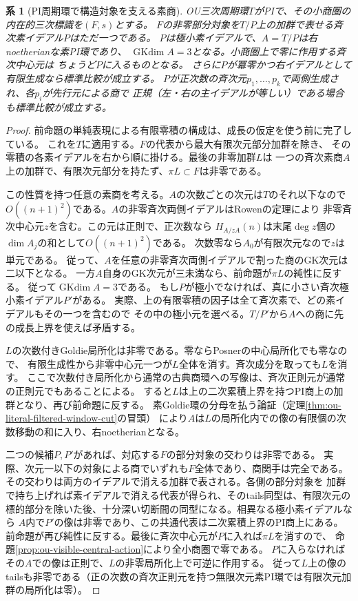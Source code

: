 \documentclass[11pt,a4paper]{ltjsarticle}
\newtheorem{corollary}[theorem]{系}
\theoremstyle{definition}
\begin{document}
\begin{corollary}[PI周期環で構造対象を支える素商]
\label{cor:ou-pi-realized-component}
OU三次周期環$T$がPIで、その小商圏の内在的三次標識を$(F,s)$とする。
$F$の非零部分対象を$T/P$上の加群で表せる斉次素イデアル$P$はただ一つである。
$P$は極小素イデアルで、$A=T/P$は右noetherianな素PI環であり、
$\operatorname{GKdim}A=3$となる。小商圏上で零に作用する斉次中心元は
ちょうど$P$に入るものとなる。
さらに$P$が冪零かつ右イデアルとして有限生成なら標準比較が成立する。
$P$が正次数の斉次元$p_1,\dots,p_k$で両側生成され、各$p_i$が先行元による商で
正規（左・右の主イデアルが等しい）である場合も標準比較が成立する。
\end{corollary}
\begin{proof}
前命題の単純表現による有限零積の構成は、成長の仮定を使う前に完了している。
これを$T$に適用する。$F$の代表から最大有限次元部分加群を除き、
その零積の各素イデアルを右から順に掛ける。最後の非零加群$L$は
一つの斉次素商$A$上の加群で、有限次元部分を持たず、$\pi L\subset F$は非零である。

この性質を持つ任意の素商を考える。$A$の次数ごとの次元は$T$のそれ以下なので
$O((n+1)^2)$である。$A$の非零斉次両側イデアルはRowenの定理により
非零斉次中心元$z$を含む。この元は正則で、正次数なら
$H_{A/zA}(n)$は末尾$\deg z$個の$\dim A_j$の和として$O((n+1)^2)$である。
次数零なら$A_0$が有限次元なので$z$は単元である。
従って、$A$を任意の非零斉次両側イデアルで割った商のGK次元は二以下となる。
一方$A$自身のGK次元が三未満なら、前命題が$\pi L$の純性に反する。
従って$\operatorname{GKdim}A=3$である。
もし$P$が極小でなければ、真に小さい斉次極小素イデアル$P'$がある。
実際、上の有限零積の因子は全て斉次素で、どの素イデアルもその一つを含むので
その中の極小元を選べる。$T/P'$から$A$への商に先の成長上界を使えば矛盾する。

$L$の次数付きGoldie局所化は非零である。零ならPosnerの中心局所化でも零なので、
有限生成性から非零中心元一つが$L$全体を消す。斉次成分を取っても$L$を消す。
ここで次数付き局所化から通常の古典商環への写像は、斉次正則元が通常の正則元でもあることによる。
すると$L$は上の二次累積上界を持つPI商上の加群となり、再び前命題に反する。
素Goldie環の分母を払う論証（定理\ref{thm:ou-literal-filtered-window-cut}の冒頭）
により$A$は$L$の局所化内での像の有限個の次数移動の和に入り、右noetherianとなる。

二つの候補$P,P'$があれば、対応する$F$の部分対象の交わりは非零である。
実際、次元一以下の対象による商でいずれも$F$全体であり、商関手は完全である。
その交わりは両方のイデアルで消える加群で表される。各側の部分対象を
加群で持ち上げれば素イデアルで消える代表が得られ、そのtails同型は、有限次元の
標的部分を除いた後、十分深い切断間の同型になる。相異なる極小素イデアルなら
$A$内で$P'$の像は非零であり、この共通代表は二次累積上界のPI商上にある。
前命題が再び純性に反する。最後に斉次中心元が$P$に入れば$\pi L$を消すので、
命題\ref{prop:ou-visible-central-action}により全小商圏で零である。
$P$に入らなければその$A$での像は正則で、$L$の非零局所化上で可逆に作用する。
従って$L$上の像のtailsも非零である（正の次数の斉次正則元を持つ無限次元素PI環では有限次元加群の局所化は零）。


\end{proof}
\end{document}

